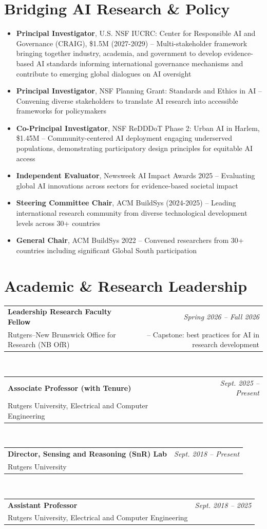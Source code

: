 \documentclass[11pt,letterpaper]{article}
\makeatletter
\newcommand{\profentry}[4]{
    \begin{tabularx}{\textwidth}{@{}X r@{}}
        \textbf{\color{darkGray}#1} & \textcolor{mediumGray}{\textit{#2}} \\
        \textcolor{mediumGray}{#3} & #4
    \end{tabularx}
}
\newcommand{\listentry}[1]{
    \item[\textcolor{accentBlue}{\small\faAngleRight}] #1
}
\makeatother
\begin{document}
\section{Bridging AI Research \& Policy}
\begin{itemize}
\listentry{\textbf{\color{UNBlue}Principal Investigator}, U.S. NSF IUCRC: Center for Responsible AI and Governance (CRAIG), \$1.5M (2027-2029) -- Multi-stakeholder framework bringing together industry, academia, and government to develop evidence-based AI standards informing international governance mechanisms and contribute to emerging global dialogues on AI oversight}
\listentry{\textbf{\color{UNBlue}Principal Investigator}, NSF Planning Grant: Standards and Ethics in AI -- Convening diverse stakeholders to translate AI research into accessible frameworks for policymakers}
\listentry{\textbf{\color{UNBlue}Co-Principal Investigator}, NSF ReDDDoT Phase 2: Urban AI in Harlem, \$1.45M -- Community-centered AI deployment engaging underserved populations, demonstrating participatory design principles for equitable AI access}
\listentry{\textbf{\color{UNBlue}Independent Evaluator}, Newsweek AI Impact Awards 2025 -- Evaluating global AI innovations across sectors for evidence-based societal impact}
\listentry{\textbf{\color{UNBlue}Steering Committee Chair}, ACM BuildSys (2024-2025) -- Leading international research community from diverse technological development levels across 30+ countries}
\listentry{\textbf{\color{UNBlue}General Chair}, ACM BuildSys 2022 -- Convened researchers from 30+ countries including significant Global South participation}
\end{itemize}

\section{Academic \& Research Leadership}
\profentry{Leadership Research Faculty Fellow}{Spring 2026 -- Fall 2026}{Rutgers--New Brunswick Office for Research (NB OfR)}{-- Capstone: best practices for AI in research development}\\[2pt]
\profentry{Associate Professor (with Tenure)}{Sept. 2025 -- Present}{Rutgers University, Electrical and Computer Engineering}{}\\[2pt]
\profentry{Director, Sensing and Reasoning (SnR) Lab}{Sept. 2018 -- Present}{Rutgers University}{}\\[2pt]
\profentry{Assistant Professor}{Sept. 2018 -- 2025}{Rutgers University, Electrical and Computer Engineering}{}
\end{document}
